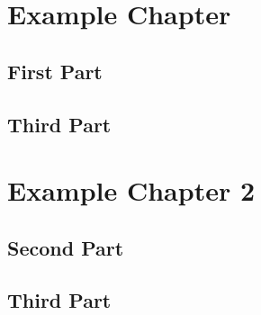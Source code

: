 %
%
%
\chapter{Example Chapter}\label{ref_ExampleChapter}

\section{First Part}\label{ref_FirstPart}
  \Blindtext[4][1] %

\section{Third Part}\label{ref_ThirdPart}
  \Blindtext[4][1] %

%
%
%
\chapter{Example Chapter 2}\label{ref_ExampleChapter2}

\section{Second Part}\label{ref_SecondPart}
  \Blindtext[4][1] %

\section{Third Part}\label{ref_ThirdPart}
  \Blindtext[4][1] %